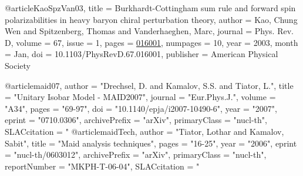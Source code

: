 @article{KaoSpzVan03,
  title = {Burkhardt-Cottingham sum rule and forward spin polarizabilities in heavy baryon chiral perturbation theory},
  author = {Kao, Chung Wen and Spitzenberg, Thomas and Vanderhaeghen, Marc},
  journal = {Phys. Rev. D},
  volume = {67},
  issue = {1},
  pages = {\href{http://link.aps.org/doi/10.1103/PhysRevD.67.016001}{016001}},
  numpages = {10},
  year = {2003},
  month = {Jan},
  doi = {10.1103/PhysRevD.67.016001},
  publisher = {American Physical Society}
}

@article{maid07,
      author         = "Drechsel, D. and Kamalov, S.S. and Tiator, L.",
      title          = "{Unitary Isobar Model - MAID2007}",
      journal        = "Eur.Phys.J.",
      volume         = "A34",
      pages          = "69-97",
      doi            = "10.1140/epja/i2007-10490-6",
      year           = "2007",
      eprint         = "0710.0306",
      archivePrefix  = "arXiv",
      primaryClass   = "nucl-th",
      SLACcitation   = "%
}
@article{maidTech,
      author         = "Tiator, Lothar and Kamalov, Sabit",
      title          = "{Maid analysis techniques}",
      pages          = "16-25",
      year           = "2006",
      eprint         = "nucl-th/0603012",
      archivePrefix  = "arXiv",
      primaryClass   = "nucl-th",
      reportNumber   = "MKPH-T-06-04",
      SLACcitation   = "%
}

